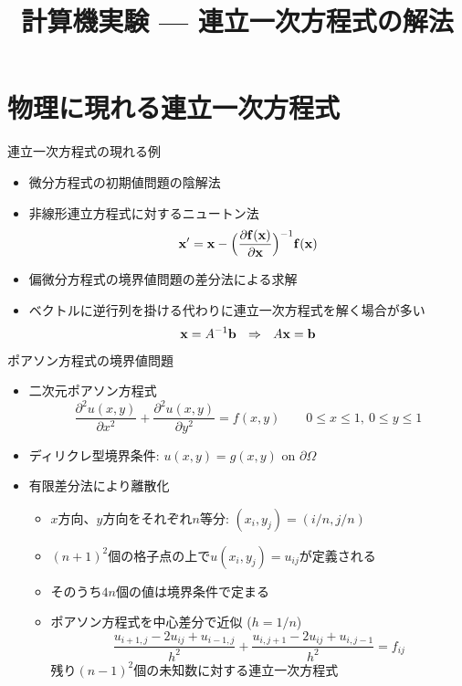 \documentclass[dvipdfmx]{beamer}
\title{計算機実験 --- 連立一次方程式の解法}
\begin{document}

\begin{frame}
  \titlepage
  \tableofcontents
\end{frame}

\section{物理に現れる連立一次方程式}

\begin{frame}[t,fragile]{連立一次方程式の現れる例}
  \begin{itemize}
    \setlength{\itemsep}{1em}
  \item 微分方程式の初期値問題の陰解法
  \item 非線形連立方程式に対するニュートン法
    \[ {\bf x}' = {\bf x} - \Big( \frac{\partial {\bf f}({\bf x})}{\partial {\bf x}} \Big)^{-1} {\bf f}({\bf x}) \]
  \item 偏微分方程式の境界値問題の差分法による求解
  \item ベクトルに逆行列を掛ける代わりに連立一次方程式を解く場合が多い
    \[ {\bf x} = A^{-1} {\bf b} \ \ \Rightarrow \ \ A {\bf x} = {\bf b} \]
  \end{itemize}
\end{frame}

\begin{frame}[t,fragile]{ポアソン方程式の境界値問題}
  \begin{itemize}
    \setlength{\itemsep}{1em}
  \item 二次元ポアソン方程式
    \[ \frac{\partial^2 u(x,y)}{\partial x^2} + \frac{\partial^2 u(x,y)}{\partial y^2} = f(x,y) \qquad 0 \le x \le 1, \ 0 \le y \le 1\]
  \item ディリクレ型境界条件: $u(x,y) = g(x,y)$ on $\partial \Omega$
  \item 有限差分法により離散化
    \begin{itemize}
    \item $x$方向、$y$方向をそれぞれ$n$等分: $(x_i,y_j) = (i/n, j/n)$
    \item $(n+1)^2$個の格子点の上で$u(x_i,y_j)=u_{ij}$が定義される
    \item そのうち$4n$個の値は境界条件で定まる
    \item ポアソン方程式を中心差分で近似 ($h=1/n$)
      \[
      \frac{u_{i+1,j}-2u_{ij}+u_{i-1,j}}{h^2} + \frac{u_{i,j+1}-2u_{ij}+u_{i,j-1}}{h^2} = f_{ij}
      \]
      残り$(n-1)^2$個の未知数に対する連立一次方程式
    \end{itemize}
  \end{itemize}
\end{frame}
\end{document}
